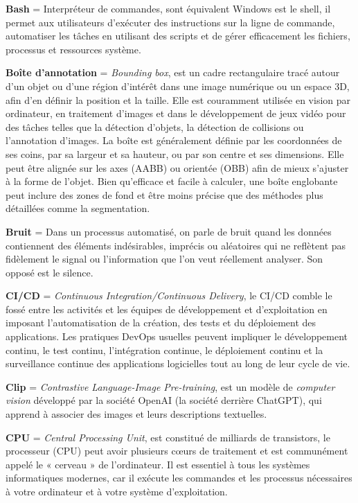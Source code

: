\textbf{Bash} = Interpréteur de commandes, sont équivalent Windows est le shell, il permet aux utilisateurs d'exécuter des instructions sur la ligne de commande, automatiser les tâches en utilisant des scripts et de gérer efficacement les fichiers, processus et ressources système.

\textbf{Boîte d'annotation} = \textit{Bounding box}, est un cadre rectangulaire tracé autour d'un objet ou d'une région d'intérêt dans une image numérique ou un espace 3D, afin d'en définir la position et la taille. Elle est couramment utilisée en vision par ordinateur, en traitement d'images et dans le développement de jeux vidéo pour des tâches telles que la détection d'objets, la détection de collisions ou l'annotation d'images. La boîte est généralement définie par les coordonnées de ses coins, par sa largeur et sa hauteur, ou par son centre et ses dimensions. Elle peut être alignée sur les axes (AABB) ou orientée (OBB) afin de mieux s'ajuster à la forme de l'objet. Bien qu'efficace et facile à calculer, une boîte englobante peut inclure des zones de fond et être moins précise que des méthodes plus détaillées comme la segmentation.

\textbf{Bruit} = Dans un processus automatisé, on parle de bruit quand les données contiennent des éléments indésirables, imprécis ou aléatoires qui ne reflètent pas fidèlement le signal ou l’information que l’on veut réellement analyser. Son opposé est le silence.

\textbf{CI/CD} = \textit{Continuous Integration/Continuous Delivery}, le CI/CD comble le fossé entre les activités et les équipes de développement et d'exploitation en imposant l'automatisation de la création, des tests et du déploiement des applications. Les pratiques DevOps usuelles peuvent impliquer le développement continu, le test continu, l'intégration continue, le déploiement continu et la surveillance continue des applications logicielles tout au long de leur cycle de vie.

\textbf{Clip} = \textit{Contrastive Language-Image Pre-training}, est un modèle de \textit{computer vision} développé par la société OpenAI (la société derrière ChatGPT), qui apprend à associer des images et leurs descriptions textuelles.


\textbf{CPU} = \textit{Central Processing Unit}, est constitué de milliards de transistors, le processeur (CPU) peut avoir plusieurs cœurs de traitement et est communément appelé le « cerveau » de l'ordinateur. Il est essentiel à tous les systèmes informatiques modernes, car il exécute les commandes et les processus nécessaires à votre ordinateur et à votre système d'exploitation.

